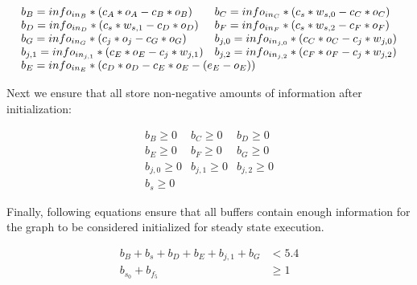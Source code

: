 \begin{displaymath}
\begin{array}{ll}
b_{B} = info_{in_B} * (c_{A} * o_A - c_{B} * o_B) &

b_{C} = info_{in_C} * (c_{s} * w_{s,0} - c_{C} * o_C) \\

b_{D} = info_{in_D} * (c_{s} * w_{s,1} - c_{D} * o_D) &

b_{F} = info_{in_F}* (c_{s} * w_{s,2} - c_{F} * o_F) \\

b_{G} = info_{in_G}* (c_{j} * o_j - c_{G} * o_G) &

b_{j, 0} = info_{in_{j,0}} * (c_C * o_C  - c_{j} * w_{j,0}) \\

b_{j, 1} = info_{in_{j,1}} * (c_E * o_E  - c_{j} * w_{j,1}) &

b_{j, 2} = info_{in_{j,2}} * (c_F * o_F  - c_{j} * w_{j,2}) \\

\multicolumn{2}{l}{b_{E} = info_{in_E}* (c_{D} * o_D - c_{E} * o_E - (e_E - o_E))} \\

\end{array}
\end{displaymath}

Next we ensure that all {{\Channels}} store non-negative amounts of
information after initialization:

\begin{displaymath}
\begin{array}{ccc}
b_{B} \ge 0 & b_{C} \ge 0 & b_{D} \ge 0 \\
b_{E} \ge 0 & b_{F} \ge 0 & b_{G} \ge 0 \\
b_{j,0} \ge 0 & b_{j,1} \ge 0 & b_{j,2} \ge 0 \\
b_{s} \ge 0
\end{array}
\end{displaymath}

Finally, following equations ensure that all buffers contain
enough information for the graph to be considered initialized for
steady state execution.

\begin{displaymath}
\begin{array}{rl}
b_{B} + b_{s} + b_{D} + b_{E} + b_{j, 1} + b_{G} & < 5.4 \\
b_{s_0} + b_{f_5} & \ge 1 \\
\end{array}
\end{displaymath}

